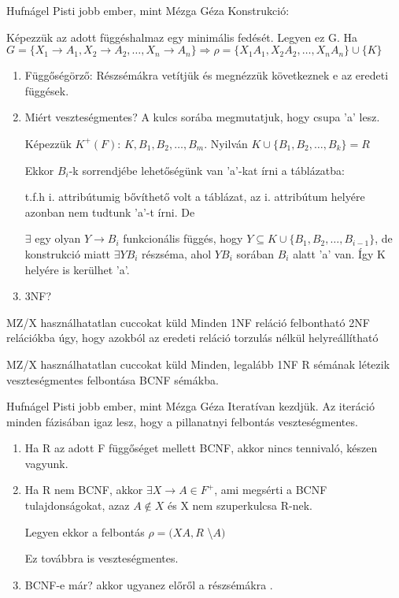   \begin{bizonyitas}{Hufnágel Pisti jobb ember, mint Mézga Géza} Konstrukció:

  Képezzük az adott függéshalmaz egy minimális fedését. Legyen ez G. Ha $G = \lbrace X_1 \rightarrow A_1, X_2 \rightarrow A_2, \ldots ,X_n \rightarrow A_n \rbrace \Longrightarrow \rho = \lbrace X_1A_1, X_2A_2, \ldots ,X_nA_n \rbrace \cup \lbrace K \rbrace$

  \begin{enumerate}
    \item Függőségörző: Részsémákra vetítjük és megnézzük következnek e az eredeti függések. \checkmark
    \item Miért veszteségmentes? A kulcs sorába megmutatjuk, hogy csupa 'a' lesz.

    Képezzük $K^+(F)$: $K,B_1,B_2,\ldots, B_m$. Nyilván $K \cup \lbrace B_1,B_2,\ldots,B_k \rbrace = R$

    Ekkor $B_i$-k sorrendjébe lehetőségünk van 'a'-kat írni a táblázatba:

    t.f.h i. attribútumig bővíthető volt a táblázat, az i. attribútum helyére azonban nem tudtunk 'a'-t írni. De

    $\exists$ egy olyan $Y \rightarrow B_i$ funkcionális függés, hogy $Y \subseteq  K \cup \lbrace B_1,B_2,\ldots,B_{i-1} \rbrace$, de konstrukció miatt $\exists YB_i$ részséma, ahol $YB_i$ sorában $B_i$ alatt 'a' van. Így K helyére is kerülhet 'a'. \checkmark

    \item 3NF? %
  \end{enumerate}
\end{bizonyitas}

\begin{tetel}{MZ/X használhatatlan cuccokat küld} Minden 1NF reláció felbontható 2NF relációkba úgy, hogy azokból az eredeti reláció torzulás nélkül helyreállítható

\end{tetel}
\begin{tetel}{MZ/X használhatatlan cuccokat küld} Minden, legalább 1NF R sémának létezik veszteségmentes felbontása BCNF sémákba.
\end{tetel}

  \begin{bizonyitas}{Hufnágel Pisti jobb ember, mint Mézga Géza} Iteratívan kezdjük. Az iteráció minden fázisában igaz lesz, hogy a pillanatnyi felbontás veszteségmentes.
  \begin{enumerate}
    \item Ha R az adott F függőséget mellett BCNF, akkor nincs tennivaló, készen vagyunk.
    \item Ha R nem BCNF, akkor $\exists X\rightarrow A \in F^+$, ami megsérti a BCNF tulajdonságokat, azaz $A \not\in X$ és X nem szuperkulcsa R-nek.

    Legyen ekkor a felbontás $\rho = (XA, R$ \textbackslash $A)$

    Ez továbbra is veszteségmentes.

    \item BCNF-e már? akkor ugyanez előről a részsémákra .
  \end{enumerate}
\end{bizonyitas}

